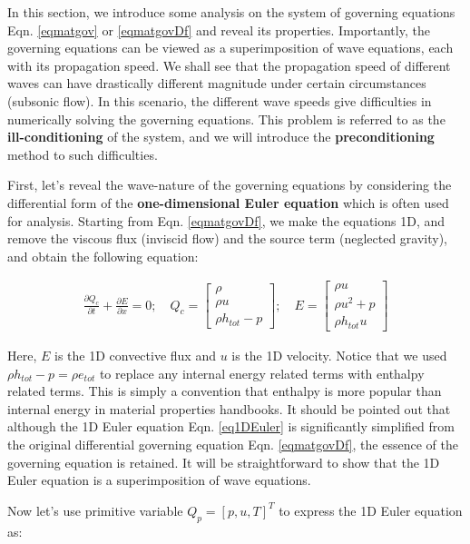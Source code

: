 \documentclass[12pt, letterpaper]{report}
\begin{document}
In this section, we introduce some analysis on the system of governing equations Eqn.
\ref{eqmatgov} or \ref{eqmatgovDf} and reveal its properties. Importantly, the governing equations
can be viewed as a superimposition of wave equations, each with its propagation speed. We shall see
that the propagation speed of different waves can have drastically different magnitude under certain
circumstances (subsonic flow). In this scenario, the different wave speeds give difficulties in
numerically solving the governing equations. This problem is referred to as the {\bf
ill-conditioning} of the system, and we will introduce the {\bf preconditioning} method to such
difficulties.  \paraspace

First, let's reveal the wave-nature of the governing equations by considering the differential form
of the {\bf one-dimensional Euler equation} which is often used for analysis. Starting from Eqn.
\ref{eqmatgovDf}, we make the equations 1D, and remove the viscous flux (inviscid flow) and the
source term (neglected gravity), and obtain the following equation:

\begin{align}\label{eq1DEuler}
   \frac{\partial Q_c}{\partial t} + \frac{\partial E}{\partial x} = 0; \quad Q_c =
   \begin{bmatrix}\rho \\ \rho u \\ \rho h_{tot} - p\end{bmatrix}; \quad E =
      \begin{bmatrix}\rho u \\ \rho u^2 + p \\ \rho h_{tot} u\end{bmatrix}
\end{align}

Here, $E$ is the 1D convective flux and $u$ is the 1D velocity. Notice that we used $\rho h_{tot} -
p = \rho e_{tot}$ to replace any internal energy related terms with enthalpy related terms. This is
simply a convention that enthalpy is more popular than internal energy in material properties
handbooks. It should be pointed out that although the 1D Euler equation Eqn. \ref{eq1DEuler} is
significantly simplified from the original differential governing equation Eqn. \ref{eqmatgovDf},
the essence of the governing equation is retained. It will be straightforward to show that the 1D
Euler equation is a superimposition of wave equations.\paraspace

Now let's use primitive variable $Q_p = [p, u, T]^T$ to express the 1D Euler equation as:
\end{document}
